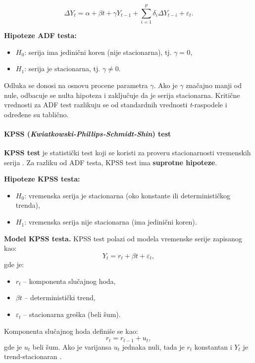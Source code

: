 \documentclass[12pt]{article}
\begin{document}
\[
\Delta Y_t = \alpha + \beta t + \gamma Y_{t-1}
+ \sum_{i=1}^{p} \delta_i \Delta Y_{t-i}
+ \varepsilon_t.
\]


\noindent \textbf{Hipoteze ADF testa:}

\begin{itemize}
\item $H_0$: serija ima jedinični koren (nije stacionarna), tj. $\gamma = 0$,
\item $H_1$: serija je stacionarna, tj. $\gamma \neq 0$.
\end{itemize}

\noindent Odluka se donosi na osnovu procene parametra $\gamma$. Ako je $\gamma$ značajno manji od nule, odbacuje se nulta hipoteza i zaključuje da je serija stacionarna. Kritične vrednosti za ADF test razlikuju se od standardnih vrednosti \textit{t}-raspodele i određene su tablično.

\paragraph{KPSS (\textit{Kwiatkowski-Phillips-Schmidt-Shin}) test}

\noindent \textbf{KPSS test} je statistički test koji se koristi za proveru stacionarnosti vremenskih serija \cite{kpss1992}. Za razliku od ADF testa, KPSS test ima \textbf{suprotne hipoteze}.

\bigskip
\noindent \textbf{Hipoteze KPSS testa:}
\begin{itemize}
    \item $H_0$: vremenska serija je stacionarna (oko konstante ili determinističkog trenda),
    \item $H_1$: vremenska serija nije stacionarna (ima jedinični koren).
\end{itemize}

\noindent \textbf{Model KPSS testa.}
KPSS test polazi od modela vremenske serije zapisanog kao:
\[
Y_t = r_t + \beta t + \varepsilon_t,
\]
gde je:
\begin{itemize}
    \item $r_t$ – komponenta slučajnog hoda,
    \item $\beta t$ – deterministički trend,
    \item $\varepsilon_t$ – stacionarna greška (beli šum).
\end{itemize}

\noindent Komponenta slučajnog hoda definiše se kao:
\[
r_t = r_{t-1} + u_t,
\]
gde je $u_t$ beli šum. Ako je varijansa $u_t$ jednaka nuli, tada je $r_t$ konstantan i $Y_t$ je trend-stacionaran \cite{kpss1992}.
\end{document}
